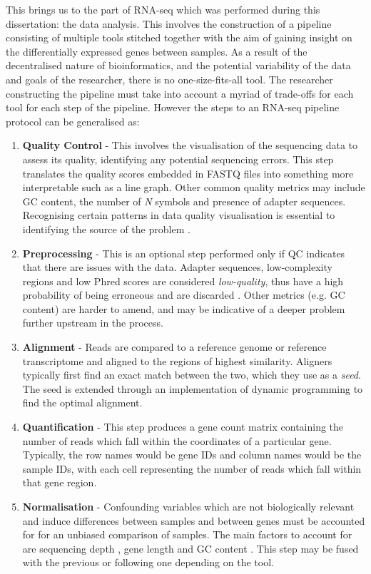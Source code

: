 This brings us to the part of RNA-seq which was performed during this dissertation: the data analysis. This involves the construction of a pipeline consisting of multiple tools stitched together with the aim of gaining insight on the differentially expressed genes between samples. As a result of the decentralised nature of bioinformatics, and the potential variability of the data and goals of the researcher, there is no one-size-fits-all tool. The researcher constructing the pipeline must take into account a myriad of trade-offs for each tool for each step of the pipeline. However the steps to an RNA-seq pipeline protocol can be generalised as:
\begin{enumerate}
\item \textbf{Quality Control} - This involves the visualisation of the sequencing data to assess its quality, identifying any potential sequencing errors. This step translates the quality scores embedded in FASTQ files into something more interpretable such as a line graph. Other common quality metrics may include GC content, the number of \textit{N} symbols and presence of adapter sequences. Recognising certain patterns in data quality visualisation is essential to identifying the source of the problem \citep{stoler2021sequencing}.
\item \textbf{Preprocessing} - This is an optional step performed only if \ac{QC} indicates that there are issues with the data. Adapter sequences, low-complexity regions and low Phred scores are considered \textit{low-quality}, thus have a high probability of being erroneous and are discarded \citep{martin2011cutadapt, prinseq++}. Other metrics (e.g. GC content) are harder to amend, and may be indicative of a deeper problem further upstream in the process. 
\item \textbf{Alignment} - Reads are compared to a reference genome or reference transcriptome and aligned to the regions of highest similarity. Aligners typically first find an exact match between the two, which they use as a \textit{seed}. The seed is extended through an implementation of dynamic programming to find the optimal alignment.
\item \textbf{Quantification} - This step produces a gene count matrix containing the number of reads which fall within the coordinates of a particular gene. Typically, the row names would be gene IDs and column names would be the sample IDs, with each cell representing the number of reads which fall within that gene region.
\item \textbf{Normalisation} - Confounding variables which are not biologically relevant and induce differences between samples and between genes must be accounted for for an unbiased comparison of samples. The main factors to account for are sequencing depth \citep{robinson2010scaling}, gene length \citep{oshlack2009transcript} and GC content \citep{risso2011gc}. This step may be fused with the previous or following one depending on the tool. 

\end{enumerate}
